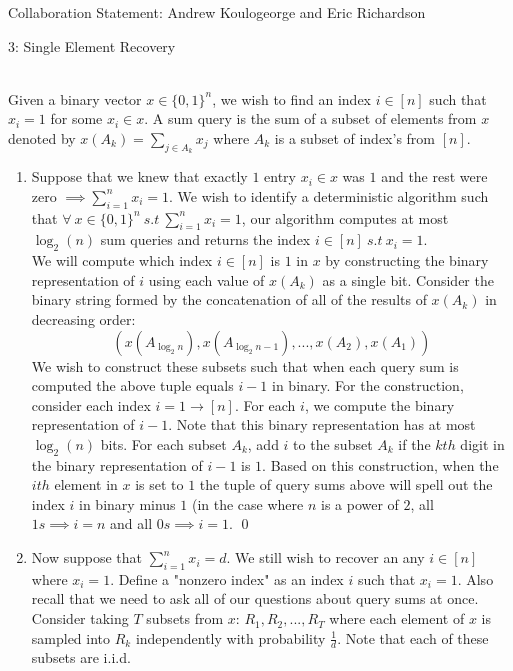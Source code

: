 \documentclass[12pt]{article}
\begin{document}

Collaboration Statement: Andrew Koulogeorge and Eric Richardson 

\begin{problem}{3: Single Element Recovery} 
\end{problem}

\begin{solution} \ \\
Given a binary vector $x \in \{0,1\}^n$, we wish to find an index $i\in [n]$ such that $x_i=1$ for some $x_i\in x$. A sum query is the sum of a subset of elements from $x$ denoted by $x(A_k) = \sum_{j\in A_k}{x_j}$ where $A_k$ is a subset of index's from $[n]$.

\begin{enumerate}[label=(\alph*)]
\item Suppose that we knew that exactly $1$ entry $x_i \in x$ was $1$ and the rest were zero $\implies \sum_{i=1}^{n}{x_i} = 1$. We wish to identify a deterministic algorithm such that $\forall~x\in \{0,1\}^n ~s.t~\sum_{i=1}^{n}{x_i} = 1$, our algorithm computes at most $\log_2(n)$ sum queries and returns the index $i\in [n]~s.t~x_i=1$.\\

We will compute which index $i\in [n]$ is $1$ in $x$ by constructing the binary representation of $i$ using each value of $x(A_k)$ as a single bit. Consider the binary string formed by the concatenation of all of the results of $x(A_k)$ in decreasing order:
\[
(x(A_{\log_{2}{n}}), x(A_{\log_2{n}-1}), ..., x(A_{2}),x(A_{1}))
\]
We wish to construct these subsets such that when each query sum is computed the above tuple equals $i-1$ in binary. For the construction, consider each index $i=1\rightarrow [n]$. For each $i$, we compute the binary representation of $i-1$. Note that this binary representation has at most $\log_{2}(n)$ bits. For each subset $A_k$, add $i$ to the subset $A_k$ if the $kth$ digit in the binary representation of $i-1$ is $1$. Based on this construction, when the $ith$ element in $x$ is set to $1$ the tuple of query sums above will spell out the index $i$ in binary minus $1$ (in the case where $n$ is a power of $2$, all $1s  \implies i=n$ and all $0s \implies i=1$. \qed

\item Now suppose that $\sum_{i=1}^{n}{x_i} = d$. We still wish to recover an any $i\in [n]$ where $x_i=1$. Define a "nonzero index" as an index $i$ such that $x_i=1$. Also recall that we need to ask all of our questions about query sums at once. Consider taking $T$ subsets from $x$: $R_1, R_2, ..., R_T$ where   each element of $x$ is sampled into $R_k$ independently with probability $\frac{1}{d}$. Note that each of these subsets are i.i.d. 


\end{enumerate}
\end{solution}
\end{document}
